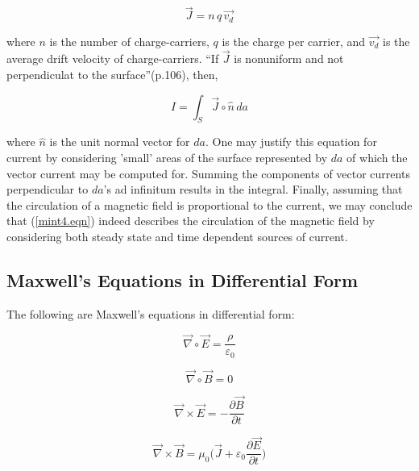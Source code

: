 \documentclass[12pt]{article}
\theoremstyle{definition}
\numberwithin{equation}{section}
\begin{document}
\begin{equation}
\vec{J}=n\,q\,\vec{v_{d}}
\label{currentdensity.eqn}
\end{equation}

where $n$ is the number of charge-carriers, $q$ is the charge per carrier, and $\vec{v_{d}}$ is the average drift velocity of charge-carriers. \enquote{If $\vec{J}$ is nonuniform and not perpendiculat to the surface}(p.106)\cite{Flei}, then,
 
\begin{equation}
I=\int_{S}\vec{J}\circ\hat{n}\,da
\label{intcurrentdensity.eqn}
\end{equation}

where $\hat{n}$ is the unit normal vector for $da$. One may justify this equation for current by considering 'small' areas of the surface represented by $da$ of which the vector current may be computed for. Summing the components of vector currents perpendicular to $da$'s ad infinitum results in the integral. Finally, assuming that the circulation of a magnetic field is proportional to the current, we may conclude that (\ref{mint4.eqn}) indeed describes the circulation of the magnetic field by considering both steady state and time dependent sources of current.

\subsection{Maxwell's Equations in Differential Form}

The following are Maxwell's equations in differential form:

\begin{equation}
\vec{\nabla}\circ\vec{E}=\frac{\rho}{\varepsilon_{0}}
\label{mdiff1.eqn}
\end{equation}

\begin{equation}
\vec{\nabla}\circ\vec{B}=0
\label{mdiff2.eqn}
\end{equation}

\begin{equation}
\vec{\nabla}\times\vec{E}=-\frac{\partial{\vec{B}}}{\partial{t}}
\label{mdiff3.eqn}
\end{equation}

\begin{equation}
\vec{\nabla}\times\vec{B}=\mu_{0}\bigg(\vec{J}+\varepsilon_{0}\frac{\partial{\vec{E}}}{\partial{t}}\bigg)
\label{mdiff4.eqn}
\end{equation}
\end{document}
